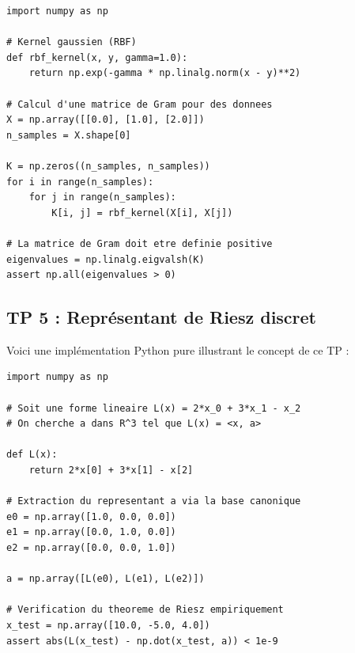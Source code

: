 \documentclass[11pt,a4paper]{article}
\begin{document}
\begin{lstlisting}
import numpy as np

# Kernel gaussien (RBF)
def rbf_kernel(x, y, gamma=1.0):
    return np.exp(-gamma * np.linalg.norm(x - y)**2)

# Calcul d'une matrice de Gram pour des donnees
X = np.array([[0.0], [1.0], [2.0]])
n_samples = X.shape[0]

K = np.zeros((n_samples, n_samples))
for i in range(n_samples):
    for j in range(n_samples):
        K[i, j] = rbf_kernel(X[i], X[j])

# La matrice de Gram doit etre definie positive
eigenvalues = np.linalg.eigvalsh(K)
assert np.all(eigenvalues > 0)
\end{lstlisting}



\subsection*{TP 5 : Représentant de Riesz discret}

Voici une implémentation Python pure illustrant le concept de ce TP :


\begin{lstlisting}
import numpy as np

# Soit une forme lineaire L(x) = 2*x_0 + 3*x_1 - x_2
# On cherche a dans R^3 tel que L(x) = <x, a>

def L(x):
    return 2*x[0] + 3*x[1] - x[2]

# Extraction du representant a via la base canonique
e0 = np.array([1.0, 0.0, 0.0])
e1 = np.array([0.0, 1.0, 0.0])
e2 = np.array([0.0, 0.0, 1.0])

a = np.array([L(e0), L(e1), L(e2)])

# Verification du theoreme de Riesz empiriquement
x_test = np.array([10.0, -5.0, 4.0])
assert abs(L(x_test) - np.dot(x_test, a)) < 1e-9
\end{lstlisting}
\end{document}
